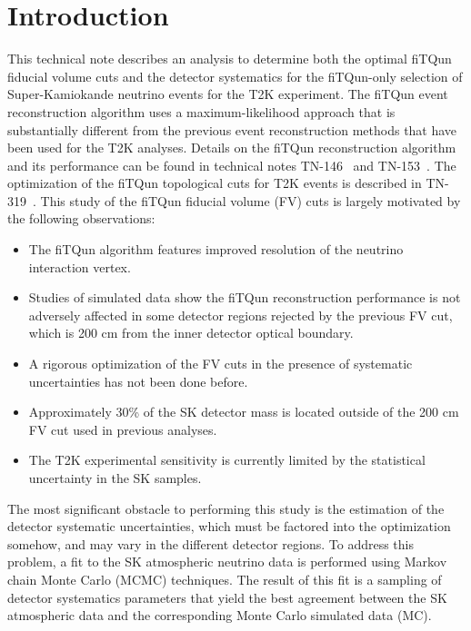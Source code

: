 
\section{Introduction}
\label{subsec:intro}

This technical note describes an analysis to determine both the optimal fiTQun
fiducial volume cuts and the detector systematics for the fiTQun-only selection
of Super-Kamiokande neutrino events for the T2K experiment.  The fiTQun event
reconstruction algorithm uses a maximum-likelihood approach that is
substantially different from the previous event reconstruction methods that
have been used for the T2K analyses.  Details on the fiTQun reconstruction
algorithm and its performance can be found in technical notes
TN-146~\cite{tn146} and TN-153~\cite{tn153}.  The optimization of the fiTQun
topological cuts for  T2K events is described in TN-319~\cite{tn319}.  This
study of the fiTQun fiducial volume (FV) cuts is largely motivated by the
following observations:

\begin{itemize}
  \item The fiTQun algorithm features improved resolution of the neutrino interaction vertex.
  \item Studies of simulated data show the fiTQun reconstruction performance is not adversely affected
    in some detector regions rejected by the previous FV cut, which is 200 cm from the inner detector
    optical boundary.
  \item A rigorous optimization of the FV cuts in the presence of systematic uncertainties 
    has not been done before.
  \item Approximately 30\% of the SK detector mass is located outside of the 200 cm FV cut used in previous analyses.
  \item The T2K experimental sensitivity is currently limited by the statistical uncertainty in the SK samples.
\end{itemize}

The most significant obstacle to performing this study is the
estimation of the detector systematic uncertainties, which must be factored
into the optimization somehow, and may vary in the different detector regions.
To address this problem, a fit to the SK
atmospheric neutrino data is performed using Markov chain Monte Carlo (MCMC)
techniques.  The result of this fit is a sampling of detector systematics
parameters that yield the best agreement between the SK atmospheric data and
the corresponding Monte Carlo simulated data (MC).


